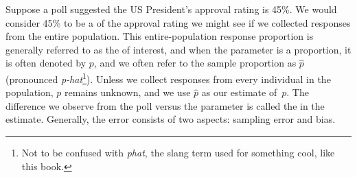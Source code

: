 Suppose a poll suggested the US President's approval
rating is 45\%.
We would consider 45\% to be a
 of the approval
rating we might see if we collected responses from the
entire population.
This entire-population response proportion is
generally referred to as the 
of interest,
and when the parameter is a proportion,
it is often denoted by $p$,
and we often refer to the sample proportion as $\hat{p}$
(pronounced \emph{p-hat}\footnote{Not to be confused with
  \emph{phat}, the slang term used for something cool,
  like this book.}).
Unless we collect responses from every individual in the population,
$p$ remains unknown, and we use $\hat{p}$ as our estimate of~$p$.
The difference we observe from the poll versus
the parameter is called the  in the estimate.
Generally, the error consists of two aspects:
sampling error and bias.


%
%


